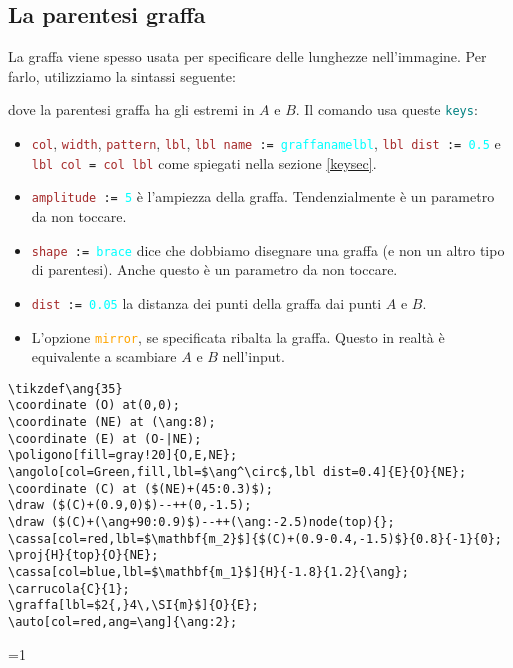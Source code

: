 \documentclass[italian, a4paper]{article}
\def\showimmagini{1} %
\def\showslowimmagini{\showimmagini} %
\newcommand{\bs}{\textbackslash}
\newcommand{\ttt}[1]{\texttt{#1}}
\newcommand{\comandons}[2][\large]{\vspace*{1mm}\noindent\fbox{\parbox{\textwidth}{#1\ttt{#2}}}}
\newcommand{\blue}[1]{\textcolor{blue}{#1}}
\newcommand{\cyan}[1]{\textcolor{cyan}{#1}}
\newcommand{\keys}{\textcolor{teal}{\ttt{keys}}}
\newcommand{\key}[1]{\textcolor{brown}{\ttt{#1}}}
\newcommand{\keyop}[1]{\textcolor{orange}{\ttt{#1}}}
\newcommand{\keyval}[1]{\cyan{\ttt{#1}}}
\begin{document}
\subsection{La parentesi graffa}
La graffa viene spesso usata per specificare delle lunghezze nell'immagine. Per farlo, utilizziamo la sintassi seguente:

\comandons{\bs graffa[\keys]\{\blue{$A$}\}\{\blue{$B$}\};}
dove la parentesi graffa ha gli estremi in $A$ e $B$. Il comando usa queste \keys:
\begin{itemize}[nolistsep]
\item \key{col}, \key{width}, \key{pattern}, \key{lbl}, \ttt{\key{lbl name} := \keyval{graffanamelbl}}, \ttt{\key{lbl dist} := \keyval{0.5}} e \ttt{\key{lbl col} = \key{col lbl}} come spiegati nella sezione \ref{keysec}.
\item \ttt{\key{amplitude} := \keyval{5}} è l'ampiezza della graffa. Tendenzialmente è un parametro da non toccare.
\item \ttt{\key{shape} := \keyval{brace}} dice che dobbiamo disegnare una graffa (e non un altro tipo di parentesi). Anche questo è un parametro da non toccare.
\item \ttt{\key{dist} := \keyval{0.05}} la distanza dei punti della graffa dai punti $A$ e $B$.
\item L'opzione \keyop{mirror}, se specificata ribalta la graffa. Questo in realtà è equivalente a scambiare $A$ e $B$ nell'input.
\end{itemize}

\begin{Verbatim}[frame=single]
\tikzdef\ang{35}
\coordinate (O) at(0,0);
\coordinate (NE) at (\ang:8);
\coordinate (E) at (O-|NE);
\poligono[fill=gray!20]{O,E,NE};
\angolo[col=Green,fill,lbl=$\ang^\circ$,lbl dist=0.4]{E}{O}{NE};
\coordinate (C) at ($(NE)+(45:0.3)$);
\draw ($(C)+(0.9,0)$)--++(0,-1.5);
\draw ($(C)+(\ang+90:0.9)$)--++(\ang:-2.5)node(top){};
\cassa[col=red,lbl=$\mathbf{m_2}$]{$(C)+(0.9-0.4,-1.5)$}{0.8}{-1}{0};
\proj{H}{top}{O}{NE};
\cassa[col=blue,lbl=$\mathbf{m_1}$]{H}{-1.8}{1.2}{\ang};
\carrucola{C}{1};
\graffa[lbl=$2{,}4\,\SI{m}$]{O}{E};
\auto[col=red,ang=\ang]{\ang:2};
\end{Verbatim}
\vspace*{-4mm}

\ifnum\showslowimmagini=1
\fi
\end{document}
